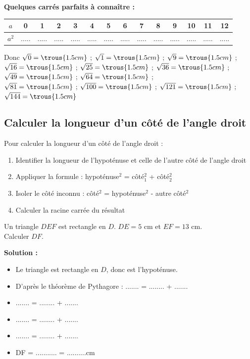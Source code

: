 \begin{examplebox}
\textbf{Quelques carrés parfaits à connaître :}

\begin{center}
\begin{tabular}{|c|c|c|c|c|c|c|c|c|c|c|c|c|c|}
\hline
$a$ & 0 & 1 & 2 & 3 & 4 & 5 & 6 & 7 & 8 & 9 & 10 & 11 & 12 \\
\hline
$a^2$ & ..... & ..... & ..... & ..... & ..... & ..... & ..... & ..... & ..... & ..... & ..... & ..... & ..... \\
\hline
\end{tabular}
\end{center}

Donc $\sqrt{0} = \trous{1.5cm}$ ; $\sqrt{1} = \trous{1.5cm}$ ; $\sqrt{9} = \trous{1.5cm}$ ; $\sqrt{16} = \trous{1.5cm}$ ; $\sqrt{25} = \trous{1.5cm}$ ; $\sqrt{36} = \trous{1.5cm}$ ; $\sqrt{49} = \trous{1.5cm}$ ; $\sqrt{64} = \trous{1.5cm}$ ;\\ $\sqrt{81} = \trous{1.5cm}$ ; $\sqrt{100} = \trous{1.5cm}$ ; $\sqrt{121} = \trous{1.5cm}$ ; $\sqrt{144} = \trous{1.5cm}$
\end{examplebox}


\subsection{Calculer la longueur d'un côté de l'angle droit}
\begin{methodebox}
Pour calculer la longueur d'un côté de l'angle droit :
\begin{enumerate}
    \item Identifier la longueur de l'hypoténuse et celle de l'autre côté de l'angle droit
    \item Appliquer la formule : hypoténuse$^2$ = côté$_1^2$ + côté$_2^2$
    \item Isoler le côté inconnu : côté$^2$ = hypoténuse$^2$ - autre côté$^2$
    \item Calculer la racine carrée du résultat
\end{enumerate}
\end{methodebox}

\begin{examplebox}
Un triangle $DEF$ est rectangle en $D$. $DE = 5$ cm et $EF = 13$ cm.\\
Calculer $DF$.

\textbf{Solution :}
\begin{itemize}
    \item Le triangle est rectangle en $D$, donc \trous{1.5cm} est l'hypoténuse.
    \item D'après le théorème de Pythagore : ....... = ........ + .......
    \item ....... = ........ + .......
    \item ....... = ........ + .......
    \item ....... = ........ + .......
    \item DF = ........... = ..........cm
\end{itemize}
\end{examplebox}

